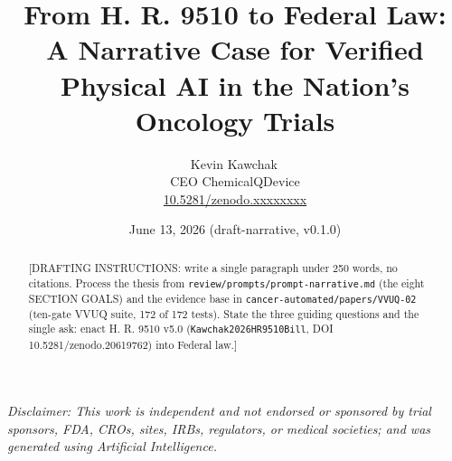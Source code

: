 \documentclass[11pt]{article}
\title{From H. R. 9510 to Federal Law:\\ A Narrative Case for Verified Physical AI in the Nation's Oncology Trials}
\author{Kevin Kawchak\,\orcidicon{0009-0007-5457-8667}\\ CEO ChemicalQDevice\\ \href{https://doi.org/10.5281/zenodo.xxxxxxxx}{10.5281/zenodo.xxxxxxxx}}
\date{June 13, 2026 \quad (draft-narrative, v0.1.0)}
\begin{document}
\maketitle
\thispagestyle{empty}

\begin{abstract}
[DRAFTING INSTRUCTIONS: write a single paragraph under 250 words, no citations.
Process the thesis from \texttt{review/prompts/prompt-narrative.md} (the eight
SECTION GOALS) and the evidence base in
\texttt{cancer-automated/papers/VVUQ-02} (ten-gate VVUQ suite, 172 of 172 tests).
State the three guiding questions and the single ask: enact H. R. 9510 v5.0
(\texttt{Kawchak2026HR9510Bill}, DOI 10.5281/zenodo.20619762) into Federal law.]
\end{abstract}

\vspace{0.2em}\noindent\footnotesize\textit{Disclaimer: This work is independent
and not endorsed or sponsored by trial sponsors, FDA, CROs, sites, IRBs,
regulators, or medical societies; and was generated using Artificial
Intelligence.}\normalsize\par




\tableofcontents
\vspace{0.3cm}










\clearpage
{}
\begingroup\raggedright\nocite{*}\endgroup


\end{document}
